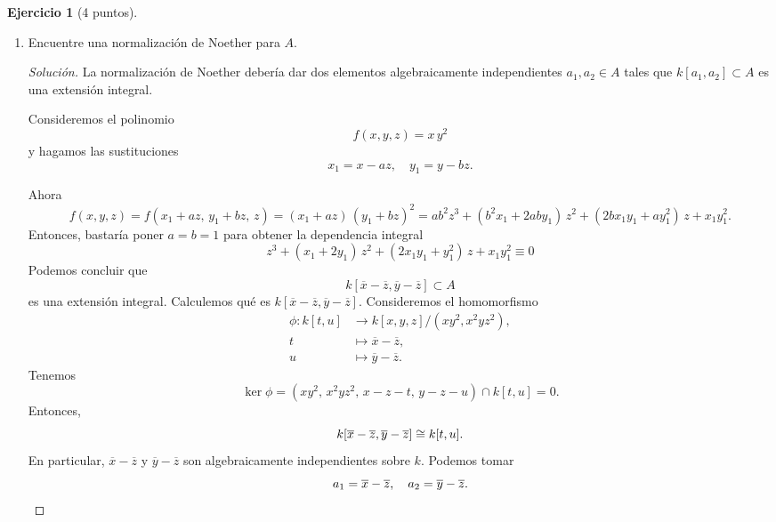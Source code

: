 \documentclass{article}
\theoremstyle{definition}
\newtheorem{ejerc}{Ejercicio}
\newenvironment{solucion}{\begin{proof}[Solución]}{\end{proof}}
\begin{document}
\begin{ejerc}[4 puntos]
\begin{enumerate}
\item[4)] Encuentre una normalización de Noether para $A$.

  \ifdefined\solutions\begin{solucion}
    La normalización de Noether debería dar dos elementos algebraicamente
    independientes $a_1,a_2 \in A$ tales que $k [a_1,a_2] \subset A$ es una
    extensión integral.

    Consideremos el polinomio
    $$f (x,y,z) = x\,y^2$$
    y hagamos las sustituciones
    $$x_1 = x - az, \quad y_1 = y - bz.$$

    Ahora
    \[ f (x,y,z) =
      f (x_1+az, \, y_1 + b z, \, z) =
      (x_1+az)\,(y_1+bz)^2 =
      a b^2 z^3 + (b^2 x_1 + 2 a b y_1)\,z^2 + (2 b x_1 y_1 + ay_1^2)\,z + x_1 y_1^2. \]
    Entonces, bastaría poner $a = b = 1$ para obtener la dependencia integral
    $$z^3 + (x_1 + 2 y_1)\,z^2 + (2 x_1 y_1 + y_1^2)\,z + x_1 y_1^2 \equiv 0$$
    Podemos concluir que
    $$k [\overline{x}-\overline{z}, \overline{y}-\overline{z}] \subset A$$
    es una extensión integral. Calculemos qué es
    $k [\overline{x}-\overline{z}, \overline{y}-\overline{z}]$. Consideremos el
    homomorfismo
    \begin{align*}
      \phi\colon k [t,u] & \to k [x,y,z]/(x y^2, x^2 y z^2),\\
      t & \mapsto \overline{x}-\overline{z},\\
      u & \mapsto \overline{y}-\overline{z}.
    \end{align*}
    Tenemos
    $$\ker \phi = (x y^2, \, x^2 y z^2, \, x - z - t, \, y-z-u) \cap k [t,u] = 0.$$
    Entonces,
    $$k [\overline{x}-\overline{z}, \overline{y}-\overline{z}] \cong k [t,u].$$
    En particular, $\overline{x}-\overline{z}$ y $\overline{y}-\overline{z}$ son
    algebraicamente independientes sobre $k$. Podemos tomar
    \[ a_1 = \overline{x}-\overline{z}, \quad a_2 =
       \overline{y}-\overline{z}. \qedhere \]
   \end{solucion}\fi
 \end{enumerate}
\end{ejerc}
\end{document}
